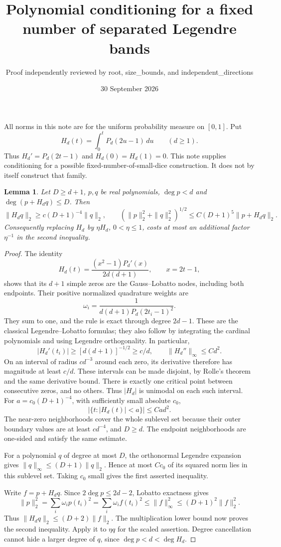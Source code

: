 \documentclass[11pt]{article}
\title{Polynomial conditioning for a fixed number of separated Legendre bands}
\author{Proof independently reviewed by root, size\_bounds, and independent\_directions}
\date{30 September 2026}
\newtheorem{lemma}{Lemma}
\begin{document}
\maketitle
All norms in this note are for the uniform probability measure on $[0,1]$.
Put
\[
 H_d(t)=\int_0^t P_d(2u-1)\,du\qquad(d\ge1).
\]
Thus $H_d'=P_d(2t-1)$ and $H_d(0)=H_d(1)=0$.
This note supplies conditioning for a possible fixed-number-of-small-dice
construction. It does not by itself construct that family.

\begin{lemma}\label{factor}
Let $D\ge d+1$, $p,q$ be real polynomials, $\deg p<d$ and
$\deg(p+H_dq)\le D$. Then
\[
 \|H_dq\|_2\ge c(D+1)^{-4}\|q\|_2,
 \qquad
 (\|p\|_2^2+\|q\|_2^2)^{1/2}
       \le C(D+1)^5\|p+H_dq\|_2.
\]
Consequently replacing $H_d$ by $\eta H_d$, $0<\eta\le1$, costs
at most an additional factor $\eta^{-1}$ in the second inequality.
\end{lemma}
\begin{proof}
The identity
\[
 H_d(t)=\frac{(x^2-1)P_d'(x)}{2d(d+1)},\qquad x=2t-1,
\]
shows that its $d+1$ simple zeros are the Gauss--Lobatto nodes,
including both endpoints. Their positive normalized quadrature weights
are
\[
 \omega_i=\frac1{d(d+1)P_d(2t_i-1)^2}.
\]
They sum to one, and the rule is exact through degree $2d-1$.
These are the classical Legendre--Lobatto formulas; they also follow
by integrating the cardinal polynomials and using Legendre orthogonality.
In particular,
\[
 |H_d'(t_i)|\ge[d(d+1)]^{-1/2}\ge c/d,
 \qquad \|H_d''\|_\infty\le C d^2.
\]
On an interval of radius $c d^{-3}$ around each zero, its derivative
therefore has magnitude at least $c/d$. These intervals can be made
disjoint, by Rolle's theorem and the same derivative bound.
There is exactly one critical point between consecutive zeros, and
no others. Thus $|H_d|$ is unimodal on each such interval.
For $a=c_0(D+1)^{-4}$, with sufficiently small absolute $c_0$,
\[
 |\{t:|H_d(t)|<a\}|\le C a d^2.
\]
The near-zero neighborhoods cover the whole sublevel set because their
outer boundary values are at least $c d^{-4}$, and $D\ge d$.
The endpoint neighborhoods are one-sided and satisfy the same estimate.

For a polynomial $q$ of degree at most $D$, the orthonormal Legendre
expansion gives $\|q\|_\infty\le(D+1)\|q\|_2$.
Hence at most $C c_0$ of its squared norm lies in this sublevel set.
Taking $c_0$ small gives the first asserted inequality.

Write $f=p+H_dq$. Since $2\deg p\le2d-2$, Lobatto exactness gives
\[
 \|p\|_2^2=\sum_i\omega_i p(t_i)^2
          =\sum_i\omega_i f(t_i)^2
          \le\|f\|_\infty^2\le(D+1)^2\|f\|_2^2.
\]
Thus $\|H_dq\|_2\le(D+2)\|f\|_2$. The multiplication lower bound
now proves the second inequality. Apply it to $\eta q$ for the
scaled assertion. Degree cancellation cannot hide a larger degree of
$q$, since $\deg p<d<\deg H_d$.
\end{proof}
\end{document}
